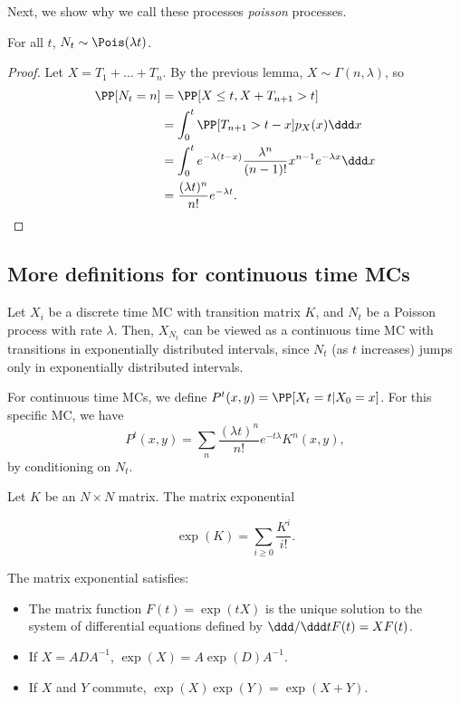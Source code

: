 Next, we show why we call these processes \textit{poisson} processes. 

\begin{theorem}
\proplabel

For all $t$, $N_t\sim \Pois(\lambda t)$. 
\end{theorem}

\begin{proof}
Let $X = T_1 + \hdots + T_n$. By the previous lemma, $X\sim \Gamma(n, \lambda)$, so 
\begin{align*}
	\PP[N_t=n] &= \PP[X\leq t, X + T_{n+1} > t] \\
						 &= \int_0^t \PP[T_{n+1} > t-x]p_X(x) \ddd x \\
						 &= \int_0^t e^{-\lambda(t-x)} \frac{\lambda^n}{(n-1)!}x^{n-1}e^{-\lambda x}\ddd x \\
						 &= \frac{(\lambda t)^n}{n!}e^{-\lambda t}.
\end{align*}
\end{proof}

\subsection{More definitions for continuous time MCs}
 
Let $X_i$ be a discrete time MC with transition matrix $K$, and $N_t$ be a Poisson process with rate $\lambda$. Then, $X_{N_t}$ can be viewed as a continuous time MC with transitions in exponentially distributed intervals, since $N_t$ (as $t$ increases) jumps only in exponentially distributed intervals.

For continuous time MCs, we define $P^t(x,y) = \PP[X_t=t | X_0=x]$. For this specific MC, we have 
\[P^t(x,y) = \sum_n \frac{(\lambda t)^n}{n!}e^{-t\lambda}K^n(x,y),\] 
by conditioning on $N_t$.

\begin{definition}

Let $K$ be an $N\times N$ matrix. The \ac{matrix exponential}

\[\exp(K) = \sum_{i\geq 0}\frac{K^i}{i!}.\] 
\end{definition}

\begin{theorem}
\proplabel

The matrix exponential satisfies: 

\begin{itemize}
	\item The matrix function $F(t) = \exp(tX)$ is the unique solution to the system of differential equations defined by $\ddd / \ddd t F(t) = XF(t)$. 
	\item If $X = ADA^{-1}$, $\exp(X) = A\exp(D)A^{-1}$.
	\item If $X$ and $Y$ commute, $\exp(X)\exp(Y) = \exp(X+Y)$.
\end{itemize}
\end{theorem}

